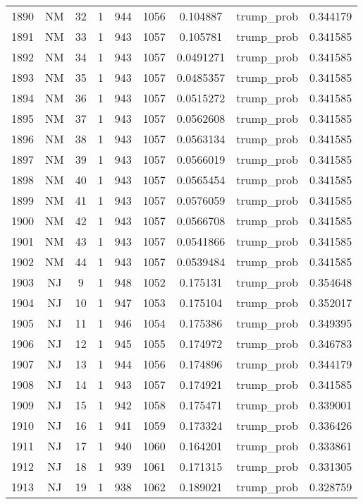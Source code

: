 \documentclass[12pt,a4paper]{article}
\begin{document}
\begin{tabular}{r|cccccccc}
	1890 & NM & 32 & 1 & 944 & 1056 & 0.104887 & trump\_prob & 0.344179 \\
	1891 & NM & 33 & 1 & 943 & 1057 & 0.105781 & trump\_prob & 0.341585 \\
	1892 & NM & 34 & 1 & 943 & 1057 & 0.0491271 & trump\_prob & 0.341585 \\
	1893 & NM & 35 & 1 & 943 & 1057 & 0.0485357 & trump\_prob & 0.341585 \\
	1894 & NM & 36 & 1 & 943 & 1057 & 0.0515272 & trump\_prob & 0.341585 \\
	1895 & NM & 37 & 1 & 943 & 1057 & 0.0562608 & trump\_prob & 0.341585 \\
	1896 & NM & 38 & 1 & 943 & 1057 & 0.0563134 & trump\_prob & 0.341585 \\
	1897 & NM & 39 & 1 & 943 & 1057 & 0.0566019 & trump\_prob & 0.341585 \\
	1898 & NM & 40 & 1 & 943 & 1057 & 0.0565454 & trump\_prob & 0.341585 \\
	1899 & NM & 41 & 1 & 943 & 1057 & 0.0576059 & trump\_prob & 0.341585 \\
	1900 & NM & 42 & 1 & 943 & 1057 & 0.0566708 & trump\_prob & 0.341585 \\
	1901 & NM & 43 & 1 & 943 & 1057 & 0.0541866 & trump\_prob & 0.341585 \\
	1902 & NM & 44 & 1 & 943 & 1057 & 0.0539484 & trump\_prob & 0.341585 \\
	1903 & NJ & 9 & 1 & 948 & 1052 & 0.175131 & trump\_prob & 0.354648 \\
	1904 & NJ & 10 & 1 & 947 & 1053 & 0.175104 & trump\_prob & 0.352017 \\
	1905 & NJ & 11 & 1 & 946 & 1054 & 0.175386 & trump\_prob & 0.349395 \\
	1906 & NJ & 12 & 1 & 945 & 1055 & 0.174972 & trump\_prob & 0.346783 \\
	1907 & NJ & 13 & 1 & 944 & 1056 & 0.174896 & trump\_prob & 0.344179 \\
	1908 & NJ & 14 & 1 & 943 & 1057 & 0.174921 & trump\_prob & 0.341585 \\
	1909 & NJ & 15 & 1 & 942 & 1058 & 0.175471 & trump\_prob & 0.339001 \\
	1910 & NJ & 16 & 1 & 941 & 1059 & 0.173324 & trump\_prob & 0.336426 \\
	1911 & NJ & 17 & 1 & 940 & 1060 & 0.164201 & trump\_prob & 0.333861 \\
	1912 & NJ & 18 & 1 & 939 & 1061 & 0.171315 & trump\_prob & 0.331305 \\
	1913 & NJ & 19 & 1 & 938 & 1062 & 0.189021 & trump\_prob & 0.328759 \\

\end{tabular}
\end{document}
